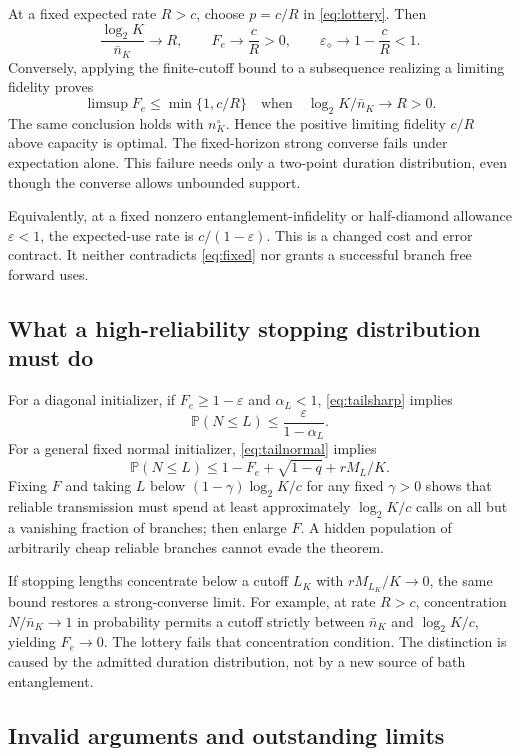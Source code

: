 \documentclass[11pt]{article}
\newcommand{\Prob}{\mathbb P}
\begin{document}
At a fixed expected rate $R>c$, choose $p=c/R$ in \eqref{eq:lottery}. Then
\[
 \frac{\log_2K}{\bar n_K}\longrightarrow R,
 \qquad F_e\longrightarrow\frac cR>0,
 \qquad\varepsilon_\diamond\longrightarrow1-\frac cR<1.
\]
Conversely, applying the finite-cutoff bound to a subsequence realizing a limiting fidelity proves
\begin{equation}
 \limsup F_e\le\min\{1,c/R\}
 \quad\text{when}\quad \log_2K/\bar n_K\to R>0.\label{eq:ratefrontier}
\end{equation}
The same conclusion holds with $n_K^\circ$. Hence the positive limiting fidelity $c/R$ above capacity is optimal. The fixed-horizon strong converse fails under expectation alone. This failure needs only a two-point duration distribution, even though the converse allows unbounded support.

Equivalently, at a fixed nonzero entanglement-infidelity or half-diamond allowance $\varepsilon<1$, the expected-use rate is $c/(1-\varepsilon)$. This is a changed cost and error contract. It neither contradicts \eqref{eq:fixed} nor grants a successful branch free forward uses.

\subsection{What a high-reliability stopping distribution must do}

For a diagonal initializer, if $F_e\ge1-\varepsilon$ and $\alpha_L<1$, \eqref{eq:tailsharp} implies
\[
 \Prob(N\le L)\le\frac{\varepsilon}{1-\alpha_L}.
\]
For a general fixed normal initializer, \eqref{eq:tailnormal} implies
\[
 \Prob(N\le L)\le1-F_e+\sqrt{1-q}+rM_L/K.
\]
Fixing $F$ and taking $L$ below $(1-\gamma)\log_2K/c$ for any fixed $\gamma>0$ shows that reliable transmission must spend at least approximately $\log_2K/c$ calls on all but a vanishing fraction of branches; then enlarge $F$. A hidden population of arbitrarily cheap reliable branches cannot evade the theorem.

If stopping lengths concentrate below a cutoff $L_K$ with $rM_{L_K}/K\to0$, the same bound restores a strong-converse limit. For example, at rate $R>c$, concentration $N/\bar n_K\to1$ in probability permits a cutoff strictly between $\bar n_K$ and $\log_2K/c$, yielding $F_e\to0$. The lottery fails that concentration condition. The distinction is caused by the admitted duration distribution, not by a new source of bath entanglement.

\subsection{Invalid arguments and outstanding limits}
\end{document}
